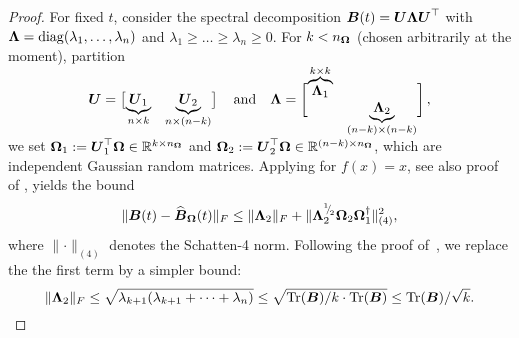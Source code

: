 \begin{proof}
For fixed $t$, consider the spectral decomposition $\boldsymbol{B}(t) = \boldsymbol{U} \boldsymbol{\Lambda} \boldsymbol{U}^{\top}$ with  
$\boldsymbol{\Lambda} = \operatorname{diag}(\lambda_1, \dots, \lambda_n)$ and $\lambda_1 \ge \dots \ge \lambda_n \ge 0$. For $k < n_{\boldsymbol{\Omega}}$ (chosen arbitrarily at the moment), partition
    \begin{equation*}
        \rule[\dimexpr-2ex-\ht\strutbox]{0pt}{\dimexpr2ex+4ex+\baselineskip}
        \mtx{U} = \begin{bmatrix}
            \smash{\underbrace{\mtx{U}_1}_{n \times k}} & \smash{\underbrace{\mtx{U}_2}_{n \times (n-k)}}
        \end{bmatrix}
        \quad \text{and} \quad
        \mtx{\Lambda} =
        \begin{bmatrix}
            \smash{\overbrace{\mtx{\Lambda}_1}^{k \times k}} & \\ & \smash{\underbrace{\mtx{\Lambda}_2}_{(n-k) \times (n-k)}}
        \end{bmatrix},
    \end{equation*}
    we set
    $\boldsymbol{\Omega}_1 := \boldsymbol{U}_1^{\top} \boldsymbol{\Omega} \in \mathbb{R}^{k \times n_{\boldsymbol{\Omega}}}$ and $\boldsymbol{\Omega}_2 := \boldsymbol{U}_2^{\top} \boldsymbol{\Omega} \in \mathbb{R}^{(n - k) \times n_{\boldsymbol{\Omega}}}$, which are independent Gaussian random matrices.
Applying \cite[Theorem B.1]{persson-2023-randomized-lowrank} for $f(x) = x$, see also proof of \cite[Corollary 8.2]{tropp-2023-randomized-algorithms}, yields the bound
    \begin{equation}
        \lVert \boldsymbol{B}(t) - \widehat{\boldsymbol{B}}_{\boldsymbol{\Omega}}(t) \rVert _F 
        \leq  \lVert \boldsymbol{\Lambda}_2 \rVert _F + \lVert \boldsymbol{\Lambda}_2^{{}^{1}{\mskip -5mu/\mskip -3mu}_{2}} \boldsymbol{\Omega}_2 \boldsymbol{\Omega}_1^{\dagger} \rVert _{(4)}^2,
        \label{equ:nystrom-proof-persson-bonud}
    \end{equation}
    where $\lVert \cdot \rVert _{(4)}$ denotes the Schatten-4 norm. Following the proof of~\cite[Lemma 3]{meyer-2021-hutch-optimal}, we replace the the first term by a simpler bound:
    \begin{equation}
        \lVert \boldsymbol{\Lambda}_2 \rVert _F
        \leq \sqrt{ \lambda_{k+1} (  \lambda_{k+1} + \cdots + \lambda_{n})}
        \leq \sqrt{ \operatorname{Tr}(\boldsymbol{B}) / k \cdot \operatorname{Tr}(\boldsymbol{B})}
        \leq \operatorname{Tr}(\boldsymbol{B}) / \sqrt{k}.
        \label{equ:nystrom-proof-frobenius-trace}
    \end{equation}
    

\end{proof}
